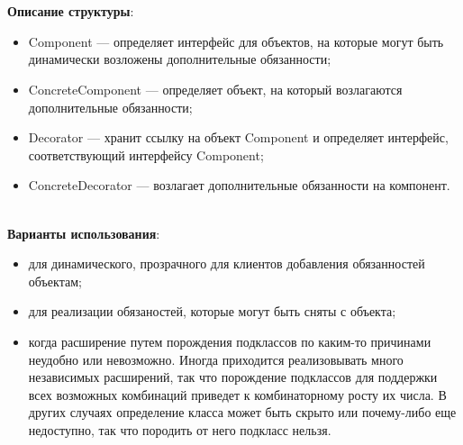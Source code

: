 \documentclass[a3paper,11pt]{report}
\def \boxSize {7cm}
\def \sboxSize {5cm}
\newcommand{\umlnoteND}[6]{
	\node[umlcd style, anchor=north, draw, shape=umlcdnote, text width=#2] at (#1) (note) {#3};
	\draw [umlcd style dashed line , ] (note.#4) ++(#5) --++(#6) coordinate(tmp) node[circle,inner sep=0pt,draw, fill=black!1, minimum size=5pt] (NoD) { };
}
\begin{document}
\\\\
\textbf{Описание структуры}:
\begin{itemize}
\item Component --- определяет интерфейс для объектов, на которые могут быть динамически возложены дополнительные обязанности;
\item ConcreteComponent --- определяет объект, на который возлагаются дополнительные обязанности;
\item Decorator --- хранит ссылку на объект Component и определяет интерфейс, соответствующий интерфейсу Component;
\item ConcreteDecorator --- возлагает дополнительные обязанности на компонент.
\end{itemize}

\large\textbf{\\Варианты использования}:
\begin{itemize}
\item для динамического, прозрачного для клиентов добавления обязанностей объектам;
\item для реализации обязаностей, которые могут быть сняты с объекта;
\item когда расширение путем порождения подклассов по каким-то причинами неудобно или невозможно. Иногда приходится реализовывать много независимых расширений, так что порождение подклассов для поддержки всех возможных комбинаций приведет к комбинаторному росту их числа. В других случаях определение класса может быть скрыто или почему-либо еще недоступно, так что породить от него подкласс нельзя.
\end{itemize}
\end{document}
